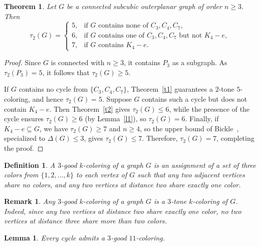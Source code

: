 \documentclass[12pt]{article}
\newtheorem{theorem}{Theorem}
\numberwithin{theorem}{section}
\numberwithin{conjecture}{section}
\numberwithin{corollary}{section}
\numberwithin{example}{section}
\newtheorem{lemma}{Lemma}
\numberwithin{lemma}{section}
\numberwithin{proposition}{section}
\numberwithin{problem}{section}
\newtheorem{remark}{Remark}
\numberwithin{remark}{section}
\numberwithin{claim}{theorem}
\newtheorem{definition}{Definition}
\numberwithin{definition}{section}
\begin{document}
\begin{theorem}
Let $G$ be a connected subcubic outerplanar graph of order $n \ge 3$. Then
\[
\tau_2(G) =
\begin{cases}
5, & \text{if } G \text{ contains none of } C_3, C_4, C_7,\\
6, & \text{if } G \text{ contains one of } C_3, C_4, C_7 \text{ but not } K_4-e,\\
7, & \text{if } G \text{ contains } K_4-e.
\end{cases}
\]
\end{theorem}

\begin{proof}
Since $G$ is connected with $n \ge 3$, it contains $P_3$ as a subgraph. As $\tau_2(P_3)=5$, it follows that $\tau_2(G)\ge 5$. 

\noindent If $G$ contains no cycle from $\{C_3, C_4, C_7\}$, Theorem~\ref{t1} guarantees a $2$-tone $5$-coloring, and hence $\tau_2(G) = 5$. Suppose $G$ contains such a cycle but does not contain $K_4 - e$. Then Theorem~\ref{t2} gives $\tau_2(G) \le 6$, while the presence of the cycle ensures $\tau_2(G) \ge 6$ (by Lemma~\ref{l1}), so $\tau_2(G) = 6$. Finally, if $K_4-e \subseteq G$, we have $\tau_2(G) \ge 7$ and $n \ge 4$, so the upper bound of Bickle~\cite{B2}, specialized to $\Delta(G) \le 3$, gives $\tau_2(G) \le 7$. Therefore, $\tau_2(G) = 7$, completing the proof.
\end{proof}

\begin{definition}
 A \emph{$3$-good $k$-coloring} of a graph $G$ is an assignment of a set of three colors from $\{1,2,\dots,k\}$ to each vertex of $G$ such that any two adjacent vertices share no colors, and any two vertices at distance two share exactly one color. 
\end{definition}

\begin{remark}
Any $3$-good $k$-coloring of a graph $G$ is a $3$-tone $k$-coloring of $G$. Indeed, since any two vertices at distance two share exactly one color, no two vertices at distance three share more than two colors.
\end{remark}

\begin{lemma}\label{l3}
Every cycle admits a $3$-good $11$-coloring.
\end{lemma}
\end{document}
